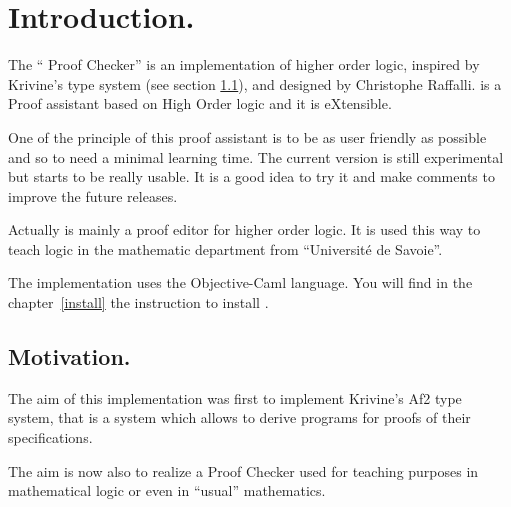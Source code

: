  
\chapter{Introduction.}

The ``\AFD{} Proof Checker'' is an implementation of higher order logic,
inspired by Krivine's type system (see section \ref{motif}), and
designed by Christophe Raffalli.
 \AFD{} is a Proof assistant based on High Order logic and it is
eXtensible. 

One of the principle of this proof assistant is to be as
user friendly as possible and so to need a minimal learning time. The
current version is still experimental but starts to be really usable. It
is a good idea to try it and make comments to improve the future
releases.


Actually \AFD{} is  mainly a proof editor
for higher order logic.  It is used this way to teach logic in
the mathematic department from ``Universit\'e de Savoie''.

The implementation uses the Objective-Caml language.  You will find in
the chapter~\ref{install} the instruction to install \AFD.

\section{Motivation.}\label{motif}

The aim of this implementation was first to implement Krivine's Af2
\cite{Kri90,KP90,Par88} type system, that is a system which allows to
derive programs for proofs of their specifications.

The aim is now also to realize a Proof Checker used for teaching
purposes in mathematical logic or even in ``usual'' mathematics.

